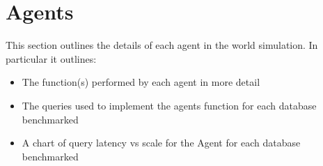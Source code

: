 \section{Agents}
This section outlines the details of each agent in the world simulation.
In particular it outlines:

\begin{itemize}
  \item The function(s) performed by each agent in more detail
  \item The queries used to implement the agents function for each database benchmarked
  \item A chart of query latency vs scale for the Agent for each database benchmarked
\end{itemize}